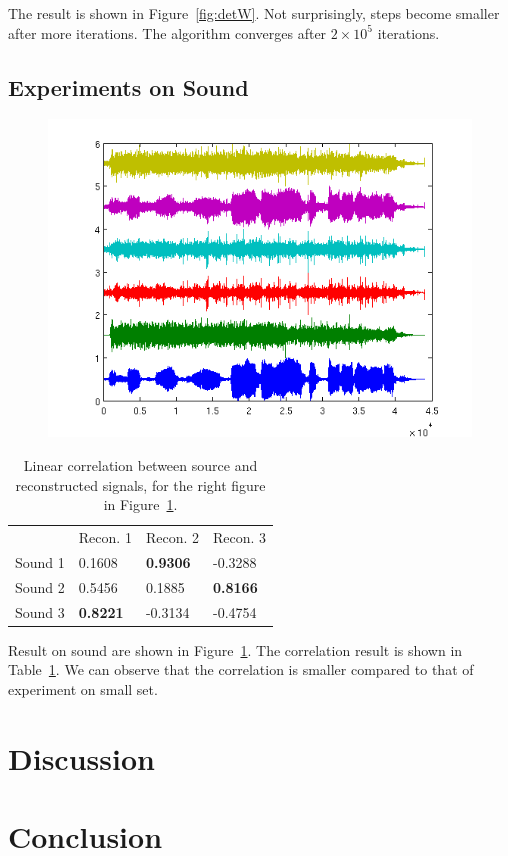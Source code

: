 \documentclass[10pt]{article}
\begin{document}
The result is shown in Figure~\ref{fig:detW}. Not surprisingly, steps
become smaller after more iterations. The algorithm converges after $2
\times 10^5$ iterations.

\subsection{Experiments on Sound}

\begin{figure}
\centering
\includegraphics[width=.6\textwidth]{sound.png}
\caption{}
\label{fig:sound}
\end{figure}

\begin{table}
\centering
\begin{tabular}{ | l l l l | }
\hline
& Recon. 1& Recon. 2& Recon. 3\\
Sound 1 &0.1608& \textbf{0.9306}&-0.3288\\
Sound 2 &0.5456& 0.1885& \textbf{0.8166}\\
Sound 3 &\textbf{0.8221}&-0.3134&-0.4754\\
\hline
\end{tabular}
\caption{Linear correlation between source and reconstructed signals, for
the right figure in Figure~\ref{fig:sound}.}
\label{tbl:corrs}
\end{table}

Result on sound are shown in Figure~\ref{fig:sound}. The correlation result
is shown in Table~\ref{tbl:corrs}. We can observe that the correlation is
smaller compared to that of experiment on small set.

\section{Discussion}

\section{Conclusion}
\end{document}
